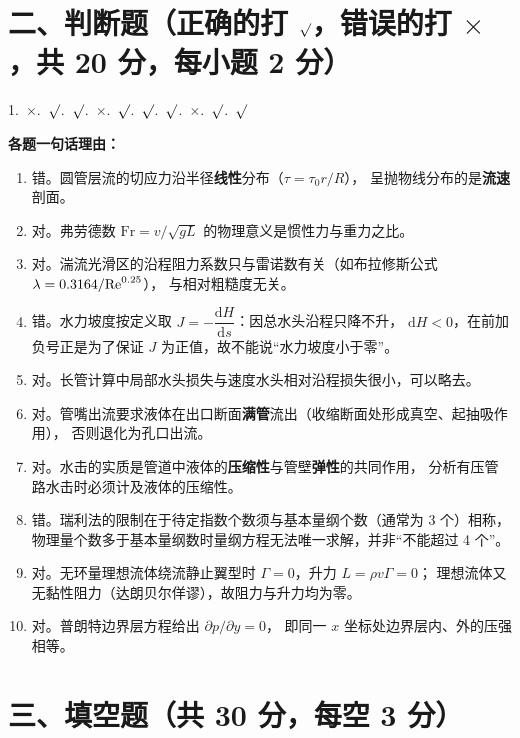 \section{二、判断题（正确的打 $\surd$，错误的打 $\times$，共 20 分，每小题 2 分）}

\begin{center}
1.~$\times$.~$\surd$.~$\surd$.~$\times$.~$\surd$.~$\surd$.~$\surd$.~$\times$.~$\surd$.~$\surd$
\end{center}

\begin{tishi}
\textbf{各题一句话理由：}
\begin{enumerate}
  \item 错。圆管层流的切应力沿半径\textbf{线性}分布（$\tau=\tau_0 r/R$），
        呈抛物线分布的是\textbf{流速}剖面。
  \item 对。弗劳德数 $\mathrm{Fr}=v/\sqrt{gL}$ 的物理意义是惯性力与重力之比。
  \item 对。湍流光滑区的沿程阻力系数只与雷诺数有关（如布拉修斯公式 $\lambda=0.3164/\mathrm{Re}^{0.25}$），
        与相对粗糙度无关。
  \item 错。水力坡度按定义取 $J=-\dfrac{\mathrm dH}{\mathrm ds}$：因总水头沿程只降不升，
        $\mathrm dH<0$，在前加负号正是为了保证 $J$ 为正值，故不能说“水力坡度小于零”。
  \item 对。长管计算中局部水头损失与速度水头相对沿程损失很小，可以略去。
  \item 对。管嘴出流要求液体在出口断面\textbf{满管}流出（收缩断面处形成真空、起抽吸作用），
        否则退化为孔口出流。
  \item 对。水击的实质是管道中液体的\textbf{压缩性}与管壁\textbf{弹性}的共同作用，
        分析有压管路水击时必须计及液体的压缩性。
  \item 错。瑞利法的限制在于待定指数个数须与基本量纲个数（通常为 3 个）相称，
        物理量个数多于基本量纲数时量纲方程无法唯一求解，并非“不能超过 4 个”。
  \item 对。无环量理想流体绕流静止翼型时 $\Gamma=0$，升力 $L=\rho v\Gamma=0$；
        理想流体又无黏性阻力（达朗贝尔佯谬），故阻力与升力均为零。
  \item 对。普朗特边界层方程给出 $\partial p/\partial y=0$，
        即同一 $x$ 坐标处边界层内、外的压强相等。
\end{enumerate}
\end{tishi}

\section{三、填空题（共 30 分，每空 3 分）}

